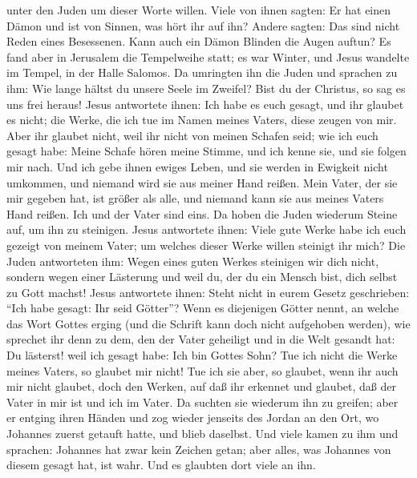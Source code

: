 unter den Juden um dieser Worte willen.  Viele von ihnen
sagten: Er hat einen Dämon und ist von Sinnen, was hört ihr auf ihn?
 Andere sagten: Das sind nicht Reden eines Besessenen.
Kann auch ein Dämon Blinden die Augen auftun?  Es fand
aber in Jerusalem die Tempelweihe statt; es war Winter, 
und Jesus wandelte im Tempel, in der Halle Salomos.  Da
umringten ihn die Juden und sprachen zu ihm: Wie lange hältst du unsere
Seele im Zweifel? Bist du der Christus, so sag es uns frei heraus!
 Jesus antwortete ihnen: Ich habe es euch gesagt, und ihr
glaubet es nicht; die Werke, die ich tue im Namen meines Vaters, diese
zeugen von mir.  Aber ihr glaubet nicht, weil ihr nicht
von meinen Schafen seid; wie ich euch gesagt habe:  Meine
Schafe hören meine Stimme, und ich kenne sie, und sie folgen mir nach.
 Und ich gebe ihnen ewiges Leben, und sie werden in
Ewigkeit nicht umkommen, und niemand wird sie aus meiner Hand reißen.
 Mein Vater, der sie mir gegeben hat, ist größer als
alle, und niemand kann sie aus meines Vaters Hand reißen.
 Ich und der Vater sind eins.  Da hoben
die Juden wiederum Steine auf, um ihn zu steinigen. 
Jesus antwortete ihnen: Viele gute Werke habe ich euch gezeigt von
meinem Vater; um welches dieser Werke willen steinigt ihr mich?
 Die Juden antworteten ihm: Wegen eines guten Werkes
steinigen wir dich nicht, sondern wegen einer Lästerung und weil du, der
du ein Mensch bist, dich selbst zu Gott machst!  Jesus
antwortete ihnen: Steht nicht in eurem Gesetz geschrieben: ``Ich habe
gesagt: Ihr seid Götter''?  Wenn es diejenigen Götter
nennt, an welche das Wort Gottes erging (und die Schrift kann doch nicht
aufgehoben werden),  wie sprechet ihr denn zu dem, den
der Vater geheiligt und in die Welt gesandt hat: Du lästerst! weil ich
gesagt habe: Ich bin Gottes Sohn?  Tue ich nicht die
Werke meines Vaters, so glaubet mir nicht!  Tue ich sie
aber, so glaubet, wenn ihr auch mir nicht glaubet, doch den Werken, auf
daß ihr erkennet und glaubet, daß der Vater in mir ist und ich im Vater.
 Da suchten sie wiederum ihn zu greifen; aber er entging
ihren Händen  und zog wieder jenseits des Jordan an den
Ort, wo Johannes zuerst getauft hatte, und blieb daselbst.
 Und viele kamen zu ihm und sprachen: Johannes hat zwar
kein Zeichen getan; aber alles, was Johannes von diesem gesagt hat, ist
wahr.  Und es glaubten dort viele an ihn.

